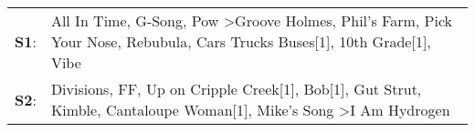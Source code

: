 \begin{supertabular}{p{0.03\textwidth}p{0.92\textwidth}}
 \textbf{S1}:  &  All In Time\textsuperscript{}, \enspace G-Song\textsuperscript{}, \enspace Pow\textsuperscript{} \textgreater \enspace Groove Holmes\textsuperscript{}, \enspace Phil's Farm\textsuperscript{}, \enspace Pick Your Nose\textsuperscript{}, \enspace Rebubula\textsuperscript{}, \enspace Cars Trucks Buses[1]\textsuperscript{}, \enspace 10th Grade[1]\textsuperscript{}, \enspace Vibe\textsuperscript{}  \enspace  \\
 \textbf{S2}:  &                                     Divisions\textsuperscript{}, \enspace FF\textsuperscript{}, \enspace Up on Cripple Creek[1]\textsuperscript{}, \enspace Bob[1]\textsuperscript{}, \enspace Gut Strut\textsuperscript{}, \enspace Kimble\textsuperscript{}, \enspace Cantaloupe Woman[1]\textsuperscript{}, \enspace Mike's Song\textsuperscript{} \textgreater \enspace I Am Hydrogen\textsuperscript{}  \enspace  \\
\end{supertabular}
